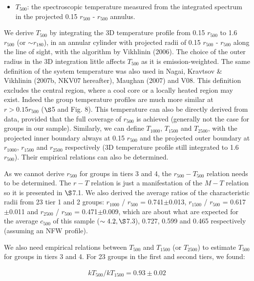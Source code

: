 \documentclass{aastex}
\begin{document}
\begin{itemize}
\item  $T_{500}$: the spectroscopic temperature measured from the integrated spectrum
in the projected 0.15 $r_{500}$ - $r_{500}$ annulus.
\end{itemize}

We derive $T_{500}$ by integrating the 3D temperature profile from 0.15 $r_{500}$ to
1.6 $r_{500}$ (or $\sim r_{180}$), in an annular cylinder with projected radii
of 0.15 $r_{500}$ - $r_{500}$ along the line of sight, with the algorithm by
Vikhlinin (2006). The choice of the outer radius in the 3D integration little
affects $T_{500}$ as it is emission-weighted. The same definition of the system
temperature was also used in Nagai, Kravtsov \& Vikhlinin (2007b, NKV07 hereafter),
Maughan (2007) and V08.
This definition excludes the central region, where a cool core or a locally heated
region may exist. Indeed the group temperature profiles are much more similar
at $r > 0.15 r_{500}$ ($\S$5 and Fig. 8).
This temperature can also be directly derived from data, provided that the full coverage of
$r_{500}$ is achieved (generally not the case for groups in our sample).
Similarly, we can define $T_{1000}$, $T_{1500}$ and $T_{2500}$, with the projected
inner boundary always at 0.15 $r_{500}$ and the projected outer boundary at $r_{1000}$,
$r_{1500}$ and $r_{2500}$ respectively (3D temperature profile still integrated to
1.6 $r_{500}$). Their empirical relations can also be determined.

As we cannot derive $r_{500}$ for groups in tiers 3 and 4, the $r_{500} - T_{500}$
relation needs to be determined. The $r - T$ relation is just a manifestation
of the $M - T$ relation so it is presented in $\S$7.1.
We also derived the average ratios of the characteristic radii from 23 tier 1 and 2
groups: $r_{1000}$ / $r_{500}$ = 0.741$\pm$0.013, $r_{1500}$ / $r_{500}$ = 0.617$\pm$0.011
and $r_{2500}$ / $r_{500}$ = 0.471$\pm$0.009, which are about what are expected for
the average $c_{500}$ of this sample ($\sim 4.2, \S$7.3), 0.727, 0.599 and 0.465
respectively (assuming an NFW profile).

We also need empirical relations between $T_{500}$ and $T_{1500}$ (or $T_{2500}$)
to estimate $T_{500}$ for groups in tiers 3 and 4.
For 23 groups in the first and second tiers, we found:

\begin{eqnarray}
kT_{500} / kT_{1500} = 0.93 \pm 0.02
\end{eqnarray}
\end{document}

